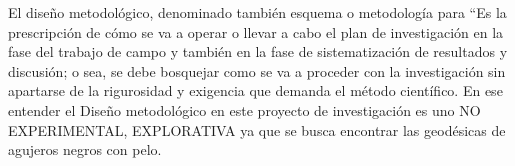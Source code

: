 \documentclass[../Main.tex]{subfiles}
\begin{document}
El diseño metodológico, denominado también esquema o metodología para “Es la prescripción de cómo se va a operar o llevar a cabo el plan de investigación en la fase del trabajo de campo y también en la fase de sistematización de resultados y discusión; o sea, se debe bosquejar como se va a proceder con la investigación sin apartarse de la rigurosidad y exigencia que demanda el método científico. En ese entender el Diseño metodológico en este proyecto de investigación es uno NO EXPERIMENTAL, EXPLORATIVA ya que se busca encontrar las geodésicas de agujeros negros con pelo.
\biblio %
\end{document}
